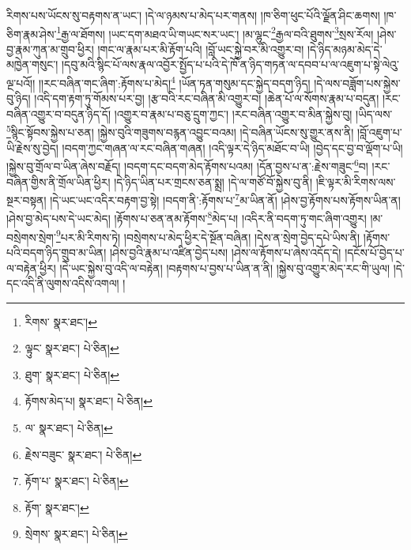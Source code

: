 རིགས་པས་ཡོངས་སུ་བརྟགས་ན་ཡང་། །དེ་ལ་ཉམས་པ་མེད་པར་གནས། །ཁ་ཅིག་ཕུང་པོའི་ལྗོན་ཤིང་ཆགས། །ཁ་ཅིག་རྣམ་ཤེས་\footnote{རིགས་  སྣར་ཐང་། }རྒྱ་ལ་ཐོགས། །ཡང་དག་མཐའ་ཡི་གཡང་སར་ཡང་། །མ་ལྷུང་\footnote{ལྟུང་  སྣར་ཐང་།  པེ་ཅིན། }རྒྱལ་བའི་ཐུགས་\footnote{ཐུག་  སྣར་ཐང་།  པེ་ཅིན། }སྲས་རོལ། །ཤེས་བྱ་རྣམ་ཀུན་མ་གྲུབ་ཕྱིར། །གང་ལ་རྣམ་པར་མི་རྟོག་པའི། །བློ་ཡང་སྐྱེ་བར་མི་འགྱུར་བ། །དེ་ཉིད་མཉམ་མེད་དེ་མཁྱེན་གསུང་། །དབུ་མའི་སྙིང་པོ་ལས་རྣལ་འབྱོར་སྤྱོད་པ་པའི་དེ་ཁོ་ན་ཉིད་གཏན་ལ་དབབ་པ་ལ་འཇུག་པ་སྟེ་ལེའུ་ལྔ་པའོ།། །།རང་བཞིན་གང་ཞིག་:རྟོགས་པ་མེད།\footnote{རྟོགས་མེད་པ།  སྣར་ཐང་།  པེ་ཅིན། } །ཡོན་ཏན་གསུམ་དང་སྐྱེད་བདག་ཉིད། །དེ་ལས་བཟློག་པས་སྐྱེས་བུ་ཉིད། །འདི་དག་རྟག་ཏུ་གོམས་པར་བྱ། །རྩ་བའི་རང་བཞིན་མི་འགྱུར་བ། །ཆེན་པོ་ལ་སོགས་རྣམ་པ་བདུན། །རང་བཞིན་འགྱུར་བ་བདུན་ཉིད་དོ། །འགྱུར་བ་རྣམ་པ་བཅུ་དྲུག་ཀྱང་། །རང་བཞིན་འགྱུར་བ་མིན་སྐྱེས་བུ། །ཡིད་ལས་\footnote{ལ་  སྣར་ཐང་།  པེ་ཅིན། }སྙིང་སྟོབས་སྐྱེས་པ་ཅན། །སྐྱེས་བུའི་གཟུགས་བརྙན་འབྱུང་བའམ། །དེ་བཞིན་ཡོངས་སུ་གྱུར་ནས་ནི། །བློ་འཇུག་པ་ཡི་རྗེས་སུ་བྱེད། །བདག་ཀྱང་གཞན་ལ་རང་བཞིན་གཞན། །འདི་ལྟར་དེ་ཉིད་མཐོང་བ་ཡི། །བྱེད་དང་བྱ་བ་ལྡོག་པ་ཡི། །སྐྱེས་བུ་གྲོལ་བ་ཡིན་ཞེས་བརྗོད། །བདག་དང་བདག་མེད་རྟོགས་པའམ། །དོན་བྱས་པ་ན་:རྗེས་གཟུང་\footnote{རྗེས་བཟུང་  སྣར་ཐང་།  པེ་ཅིན། }བ། །རང་བཞིན་གྱིས་ནི་གྲོལ་ཡིན་ཕྱིར། །དེ་ཉིད་ཡིན་པར་གྲངས་ཅན་སྨྲ། །དེ་ལ་གཙོ་བོ་སྐྱེས་བུ་ནི། །ཇི་ལྟར་མི་རིགས་ལས་སྔར་བསྟན། །དེ་ཡང་ཡང་འདིར་བརྟག་བྱ་སྟེ། །བདག་ནི་:རྟོགས་པ་\footnote{རྟོག་པ་  སྣར་ཐང་།  པེ་ཅིན། }མ་ཡིན་ནོ། །ཤེས་བྱ་རྟོགས་པས་རྟོགས་ཡིན་ན། །ཤེས་བྱ་མེད་པས་དེ་ཡང་མེད། །རྟོགས་པ་ཅན་ནམ་རྟོགས་\footnote{རྟོག་  སྣར་ཐང་། }མེད་པ། །འདིར་ནི་བདག་ཏུ་གང་ཞིག་འགྱུར། །མ་བསྲེགས་སྲེག་\footnote{སྲེགས་  སྣར་ཐང་།  པེ་ཅིན། }པར་མི་རིགས་ཏེ། །བསྲེགས་པ་མེད་ཕྱིར་དེ་སྔོན་བཞིན། །དེས་ན་སྲེག་བྱེད་དཔེ་ཡིས་ནི། །རྟོགས་པའི་བདག་ཉིད་གྲུབ་མ་ཡིན། །ཤེས་བྱའི་རྣམ་པ་འཛིན་བྱེད་པས། །ཤེས་ལ་རྟོགས་པ་ཞེས་འདོད་དེ། །དངོས་པོ་བྱེད་པ་ལ་བརྟེན་ཕྱིར། །དེ་ཡང་སྐྱེས་བུ་འདི་ལ་བརྟེན། །བརྟགས་པ་བྱས་པ་ཡིན་ན་ནི། །སྐྱེས་བུ་འགྱུར་མེད་རང་གི་ཡུལ། །དེ་དང་འདི་ནི་ལུགས་འདིས་འགལ། །
